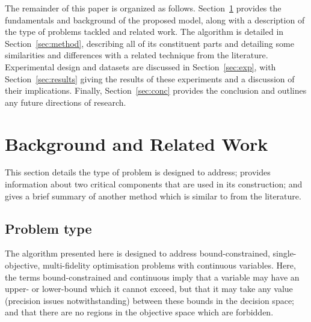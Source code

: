\documentclass[journal]{IEEEtran}
\begin{document}
The remainder of this paper is organized as follows. Section~\ref{sec:back} provides the fundamentals and background of the proposed model, along with a description of the type of problems tackled and related work. The \AlgName{} algorithm is detailed in Section~\ref{sec:method}, describing all of its constituent parts and detailing some similarities and differences with a related technique from the literature. Experimental design and datasets are discussed in Section~\ref{sec:exp}, with Section~\ref{sec:results} giving the results of these experiments and a discussion of their implications. Finally, Section~\ref{sec:conc} provides the conclusion and outlines any future directions of research.



\section{Background and Related Work}\label{sec:back}
This section details the type of problem \AlgName{} is designed to address; provides information about two critical components that are used in its construction; and gives a brief summary of another method which is similar to \AlgName{} from the literature.

\subsection{Problem type}
The algorithm presented here is designed to address bound-constrained, single-objective, multi-fidelity optimisation problems with continuous variables. Here, the terms bound-constrained and continuous imply that a variable may have an upper- or lower-bound which it cannot exceed, but that it may take any value (precision issues notwithstanding) between these bounds in the decision space; and that there are no regions in the objective space which are forbidden. 
\end{document}

